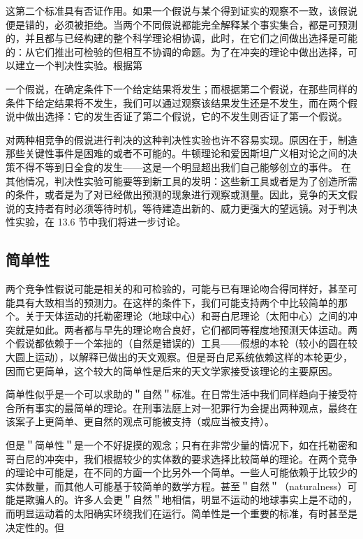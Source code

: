 这第二个标准具有否证作用。如果一个假说与某个得到证实的观察不一致，该假说便是错的，必须被拒绝。当两个不同假说都能完全解释某个事实集合，都是可预测的，并且都与已经构建的整个科学理论相协调，此时，在它们之间做出选择是可能的：从它们推出可检验的但相互不协调的命题。为了在冲突的理论中做出选择，可以建立一个判决性实验。根据第

一个假说，在确定条件下一个给定结果将发生；而根据第二个假说，在那些同样的条件下给定结果将不发生，我们可以通过观察该结果发生还是不发生，而在两个假说中做出选择：它的发生否证了第二个假说，它的不发生则否证了第一个假说。

对两种相竞争的假说进行判决的这种判决性实验也许不容易实现。原因在于，制造那些关键性事件是困难的或者不可能的。牛顿理论和爱因斯坦广义相对论之间的决策不得不等到日全食的发生——这是一个明显超出我们自己能够创立的事件。\cite{eddington1919} 在其他情况，判决性实验可能要等到新工具的发明：这些新工具或者是为了创造所需的条件，或者是为了对已经做出预测的现象进行观察或测量。因此，竞争的天文假说的支持者有时必须等待时机，等待建造出新的、威力更强大的望远镜。对于判决性实验，在 13.6 节中我们将进一步讨论。

\subsection{简单性}
两个竞争性假说可能是相关的和可检验的，可能与已有理论吻合得同样好，甚至可能具有大致相当的预测力。在这样的条件下，我们可能支持两个中比较简单的那个。关于天体运动的托勒密理论（地球中心）和哥白尼理论（太阳中心）之间的冲突就是如此。两者都与早先的理论吻合良好，它们都同等程度地预测天体运动。两个假说都依赖于一个笨拙的（自然是错误的）工具——假想的本轮（较小的圆在较大圆上运动），以解释已做出的天文观察。但是哥白尼系统依赖这样的本轮更少，因而它更简单，这个较大的简单性是后来的天文学家接受该理论的主要原因。\cite{kuhn1957b}

简单性似乎是一个可以求助的＂自然＂标准。在日常生活中我们同样趋向于接受符合所有事实的最简单的理论。在刑事法庭上对一犯罪行为会提出两种观点，最终在该案子上更简单、更自然的观点可能被支持（或应当被支持）。

但是＂简单性＂是一个不好捉摸的观念；只有在非常少量的情况下，如在托勒密和哥白尼的冲突中，我们根据较少的实体数的要求选择比较简单的理论。在两个竞争的理论中可能是，在不同的方面一个比另外一个简单。一些人可能依赖于比较少的实体数量，而其他人可能基于较简单的数学方程。甚至＂自然＂（naturalness）可能是欺骗人的。许多人会更＂自然＂地相信，明显不运动的地球事实上是不动的，而明显运动着的太阳确实环绕我们在运行。简单性是一个重要的标准，有时甚至是决定性的。但

